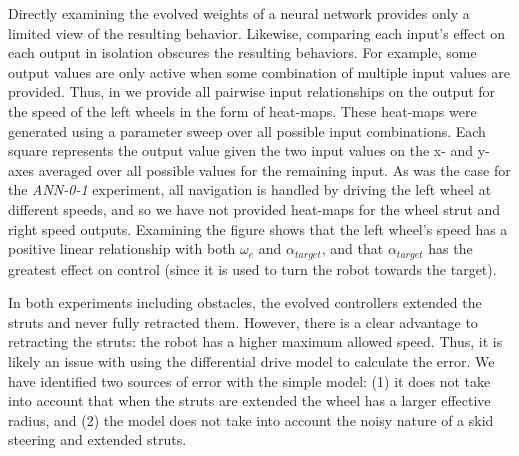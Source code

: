 %
Directly examining the evolved weights of a neural network provides only a limited view of the resulting behavior. Likewise, comparing each input's effect on each output in isolation obscures the resulting behaviors.
%
For example, some output values are only active when some combination of multiple input values are provided.
%
Thus, in  we provide all pairwise input relationships on the output for the speed of the left wheels in the form of heat-maps.
%
These heat-maps were generated using a parameter sweep over all possible input combinations. Each square represents the output value given the two input values on the x- and y-axes averaged over all possible values for the remaining input.
%
%
As was the case for the \emph{ANN-0-1} experiment, all navigation is handled by driving the left wheel at different speeds, and so we have not provided heat-maps for the wheel strut and right speed outputs.
%
Examining the figure shows that the left wheel's speed has a positive linear relationship with both $\omega_e$ and $\alpha_{\mathit{target}}$, and that $\alpha_{\mathit{target}}$ has the greatest effect on control (since it is used to turn the robot towards the target).
%


In both experiments including obstacles, the evolved controllers extended the struts and never fully retracted them.
%
However, there is a clear advantage to retracting the struts: the robot has a higher maximum allowed speed.
%
Thus, it is likely an issue with using the differential drive model to calculate the error.
%
We have identified two sources of error with the simple model: (1) it does not take into account that when the struts are extended the wheel has a larger effective radius, and (2) the model does not take into account the noisy nature of a skid steering and extended struts.


